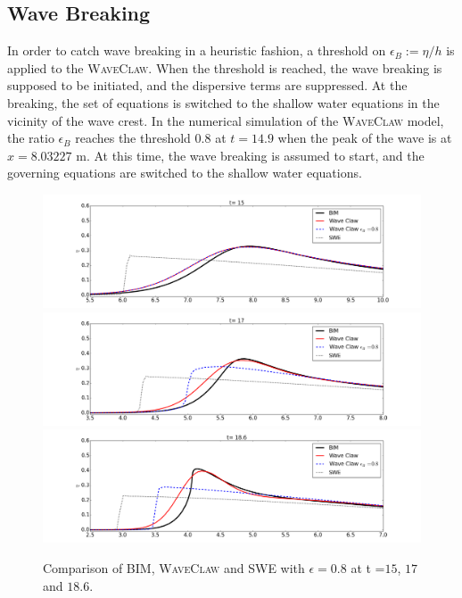 \documentclass[review]{elsarticle}
\begin{document}
\subsection{Wave Breaking}

In order to catch wave breaking in a heuristic fashion,
a threshold on $\epsilon_B:=\eta/h$ is applied to the \textsc{WaveClaw}.
When the threshold is reached, 
the wave breaking is supposed to be initiated, 
and the dispersive terms are suppressed.
At the breaking, the set of equations is
switched to the shallow water equations
in the vicinity of the wave crest.
In the numerical simulation of the \textsc{WaveClaw} model,
the ratio $\epsilon_B$ reaches the threshold $0.8$ at $t=14.9$
when the peak of the wave is at $x=8.03227$ m.
At this time, the wave breaking is assumed to start, 
and the governing equations are switched 
to the shallow water equations.

\begin{figure}[!htb]
\centering
\includegraphics[width=.9\textwidth]{_fig/bim_dgeo_etaB8_150.png}\\
\includegraphics[width=.9\textwidth]{_fig/bim_dgeo_etaB8_170.png}\\
\includegraphics[width=.9\textwidth]{_fig/bim_dgeo_etaB8_186.png}
\caption{Comparison of BIM, \textsc{WaveClaw} and SWE 
with $\epsilon=0.8$ at t =$15$, $17$ and $18.6$.}
\label{fig:dgeo_th08}
\end{figure}
\end{document}
